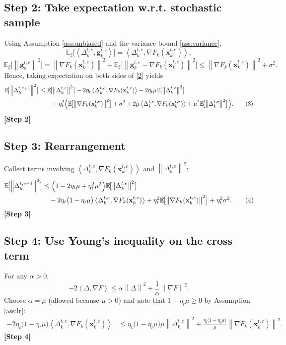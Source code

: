 \documentclass{article}
\newcommand{\E}{\mathbb{E}}
\newcommand{\norm}[1]{\left\lVert #1 \right\rVert}
\newcommand{\inner}[2]{\left\langle #1,#2 \right\rangle}
\begin{document}
\subsection*{Step 2: Take expectation w.r.t. stochastic sample}
Using Assumption \ref{ass:unbiased} and the variance bound \ref{ass:variance},
\[
\E_{\xi}\!\bigl[\inner{\Delta_{k}^{t,e}}{\mathbf{g}_{k}^{t,e}}\bigr]
=\inner{\Delta_{k}^{t,e}}{\nabla F_k(\mathbf{x}_{k}^{t,e})},
\]
\[
\E_{\xi}\!\bigl[\norm{\mathbf{g}_{k}^{t,e}}^{2}\bigr]
=\norm{\nabla F_k(\mathbf{x}_{k}^{t,e})}^{2}
+\E_{\xi}\!\bigl[\norm{\mathbf{g}_{k}^{t,e}-\nabla F_k(\mathbf{x}_{k}^{t,e})}^{2}\bigr]
\le\norm{\nabla F_k(\mathbf{x}_{k}^{t,e})}^{2}+\sigma^{2}.
\]
Hence, taking expectation on both sides of \eqref{2} yields
\begin{align}
\E\!\bigl[\norm{\Delta_{k}^{t,e+1}}^{2}\bigr]
&\le
\E\!\bigl[\norm{\Delta_{k}^{t,e}}^{2}\bigr]
-2\eta_t\inner{\Delta_{k}^{t,e}}{\nabla F_k(\mathbf{x}_{k}^{t,e})}
-2\eta_t\mu\E\!\bigl[\norm{\Delta_{k}^{t,e}}^{2}\bigr]\nonumber\\
&\qquad
+\eta_t^{2}\Bigl(
\E\!\bigl[\norm{\nabla F_k(\mathbf{x}_{k}^{t,e})}^{2}\bigr]
+ \sigma^{2}
+2\mu\inner{\Delta_{k}^{t,e}}{\nabla F_k(\mathbf{x}_{k}^{t,e})}
+\mu^{2}\E\!\bigl[\norm{\Delta_{k}^{t,e}}^{2}\bigr]\Bigr).
\tag{3}
\end{align}
\noindent\textbf{[Step 2]}

\subsection*{Step 3: Rearrangement}
Collect terms involving $\inner{\Delta_{k}^{t,e}}{\nabla F_k(\mathbf{x}_{k}^{t,e})}$ and $\norm{\Delta_{k}^{t,e}}^{2}$:
\begin{align}
\E\!\bigl[\norm{\Delta_{k}^{t,e+1}}^{2}\bigr]
&\le
\Bigl(1-2\eta_t\mu+\eta_t^{2}\mu^{2}\Bigr)\E\!\bigl[\norm{\Delta_{k}^{t,e}}^{2}\bigr]\nonumber\\
&\quad -2\eta_t\bigl(1-\eta_t\mu\bigr)\inner{\Delta_{k}^{t,e}}{\nabla F_k(\mathbf{x}_{k}^{t,e})}
+\eta_t^{2}\E\!\bigl[\norm{\nabla F_k(\mathbf{x}_{k}^{t,e})}^{2}\bigr]
+\eta_t^{2}\sigma^{2}.
\tag{4}
\end{align}
\noindent\textbf{[Step 3]}

\subsection*{Step 4: Use Young’s inequality on the cross term}
For any $\alpha>0$,
\[
-2\inner{\Delta}{\nabla F}\le
\alpha\norm{\Delta}^{2}+\frac{1}{\alpha}\norm{\nabla F}^{2}.
\]
Choose $\alpha=\mu$ (allowed because $\mu>0$) and note that $1-\eta_t\mu\ge0$ by Assumption \ref{ass:lr}:
\begin{align}
-2\eta_t\bigl(1-\eta_t\mu\bigr)\inner{\Delta_{k}^{t,e}}{\nabla F_k(\mathbf{x}_{k}^{t,e})}
&\le
\eta_t\bigl(1-\eta_t\mu\bigr)\mu\norm{\Delta_{k}^{t,e}}^{2}
+\frac{\eta_t\bigl(1-\eta_t\mu\bigr)}{\mu}\norm{\nabla F_k(\mathbf{x}_{k}^{t,e})}^{2}.
\tag{5}
\end{align}
\noindent\textbf{[Step 4]}
\end{document}
